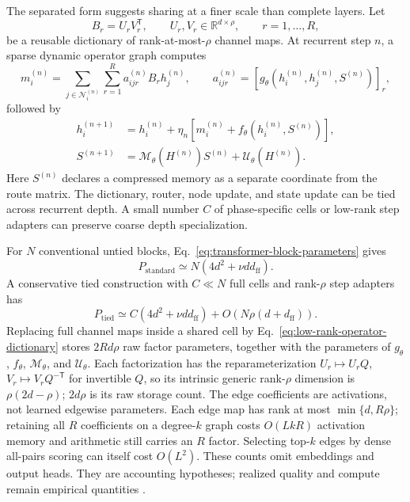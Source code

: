 \documentclass[10pt]{article}
\theoremstyle{definition}
\theoremstyle{remark}
\begin{document}
The separated form suggests sharing at a finer scale than complete layers.  Let
\begin{equation}
B_r=U_rV_r^{\mathsf T},
\qquad
U_r,V_r\in\mathbb R^{d\times\rho},
\qquad r=1,\ldots,R,
\label{eq:low-rank-operator-dictionary}
\end{equation}
be a reusable dictionary of rank-at-most-$\rho$ channel maps.  At recurrent step $n$, a sparse
dynamic operator graph computes
\begin{equation}
m_i^{(n)}
=
\sum_{j\in\mathcal N_i^{(n)}}
\sum_{r=1}^{R}
a_{ijr}^{(n)}B_rh_j^{(n)},
\qquad
a_{ijr}^{(n)}
=\left[g_\theta\!\left(h_i^{(n)},h_j^{(n)},S^{(n)}\right)\right]_r,
\label{eq:recurrent-operator-message}
\end{equation}
followed by
\begin{align}
h_i^{(n+1)}
&=h_i^{(n)}
+\eta_n\left[m_i^{(n)}+f_\theta\!\left(h_i^{(n)},S^{(n)}\right)\right],
\label{eq:recurrent-operator-node-update}\\
S^{(n+1)}
&=\mathcal M_\theta\!\left(H^{(n)}\right)S^{(n)}
+\mathcal U_\theta\!\left(H^{(n)}\right).
\label{eq:recurrent-operator-state-update}
\end{align}
Here $S^{(n)}$ declares a compressed memory as a separate coordinate from the route matrix.  The
dictionary, router, node update, and state update can be tied across recurrent depth.  A small
number $C$ of phase-specific cells or low-rank step adapters can preserve coarse depth
specialization.

For $N$ conventional untied blocks, Eq.~\ref{eq:transformer-block-parameters} gives
\begin{equation}
P_{\mathrm{standard}}
\simeq N\left(4d^2+\nu d d_{\mathrm{ff}}\right).
\label{eq:standard-depth-parameters}
\end{equation}
A conservative tied construction with $C\ll N$ full cells and rank-$\rho$ step adapters has
\begin{equation}
P_{\mathrm{tied}}
\simeq C\left(4d^2+\nu d d_{\mathrm{ff}}\right)
+O\!\left(N\rho(d+d_{\mathrm{ff}})\right).
\label{eq:tied-depth-parameters}
\end{equation}
Replacing full channel maps inside a shared cell by Eq.~\ref{eq:low-rank-operator-dictionary}
stores $2Rd\rho$ raw factor parameters, together with the parameters of $g_\theta$, $f_\theta$,
$\mathcal M_\theta$, and $\mathcal U_\theta$.  Each factorization has the reparameterization
$U_r\mapsto U_rQ$, $V_r\mapsto V_rQ^{-\mathsf T}$ for invertible $Q$, so its intrinsic generic
rank-$\rho$ dimension is $\rho(2d-\rho)$; $2d\rho$ is its raw storage count.  The edge coefficients
are activations, not learned edgewise parameters.  Each edge map has rank at most
$\min\{d,R\rho\}$; retaining all $R$ coefficients on a degree-$k$ graph costs $O(LkR)$ activation
memory and arithmetic still carries an $R$ factor.  Selecting top-$k$ edges by dense all-pairs
scoring can itself cost $O(L^2)$.  These counts omit embeddings and output heads.  They are
accounting hypotheses; realized quality and compute remain empirical quantities \cite{hu2022lora}.
\end{document}
